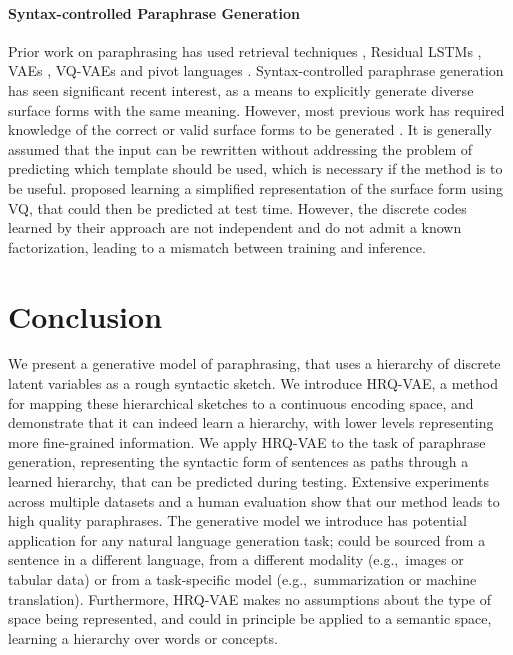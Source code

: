 \documentclass[11pt]{article}
\begin{document}
\paragraph{Syntax-controlled Paraphrase Generation}





Prior work on paraphrasing has used retrieval techniques \cite{barzilay-mckeown-2001-extracting}, Residual LSTMs \cite{prakash-etal-2016-neural}, VAEs \cite{bowman-etal-2016-generating}, VQ-VAEs
\cite{roy-grangier-2019-unsupervised} and pivot languages \cite{mallinson-etal-2017-paraphrasing}. Syntax-controlled paraphrase generation has seen significant recent interest, as a means to explicitly generate diverse surface forms with the same meaning. However, most previous work has required knowledge of the correct or valid surface forms to be generated \cite{iyyer-etal-2018-adversarial,chen-etal-2019-controllable,sgcp2020,meng2021conrpg}. It is generally assumed that the input can be rewritten without addressing the problem of predicting which template should be used, which is necessary if the method is to be useful. \citet{hosking-lapata-2021-factorising} proposed learning a simplified representation of the surface form using VQ, that could then be predicted at test time. However, the discrete codes learned by their approach are not independent and do not admit a known factorization, leading to a mismatch between training and inference. 






\section{Conclusion}

We present a generative model of paraphrasing, that uses a hierarchy of discrete latent variables as a rough syntactic sketch. We introduce HRQ-VAE, a method for mapping these hierarchical sketches to a continuous encoding space, and demonstrate that it can indeed learn a hierarchy, with lower levels representing more fine-grained information. We apply HRQ-VAE to the task of paraphrase generation, representing the syntactic form of sentences as paths through a learned hierarchy, that can be predicted during testing. Extensive experiments across multiple datasets and a human evaluation show that our method leads to high quality paraphrases. The generative model we introduce has potential application for any natural language generation task;  could be sourced from a sentence in a different language, from a different modality (e.g.,~images or tabular data) or from a task-specific model (e.g.,~summarization or machine translation). 
Furthermore, HRQ-VAE makes no assumptions about the type of space being represented, and could in principle be applied to a semantic space, learning a hierarchy over words or concepts.
\end{document}
